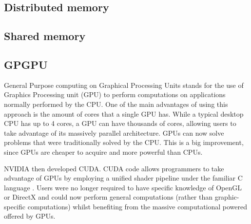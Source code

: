 \documentclass[12pt]{book}
\begin{document}
\subsection{Distributed memory}
\subsection{Shared memory}

\subsection{GPGPU}

General Purpose computing on Graphical Processing Units stands for the use of Graphics Processing unit (GPU) to perform computations on applications normally performed by the CPU. One of the main advantages of using this approach is the amount of cores that a single GPU has. While a typical desktop CPU has up to 4 cores, a GPU can have thousands of cores, allowing users to take advantage of its massively parallel architecture. GPUs can now solve problems that were traditionally solved by the CPU. This is a big improvement, since GPUs are cheaper to acquire and more powerful than CPUs.\par
	NVIDIA then developed CUDA. CUDA code allows programmers to take advantage of GPUs by employing a unified shader pipeline under the familiar C language \cite{cuda_by_example}. Users were no longer required to have specific knowledge of OpenGL or DirectX and could now perform general computations (rather than graphic-specific computations) whilst benefiting from the massive computational powered offered by GPUs. 
\end{document}
